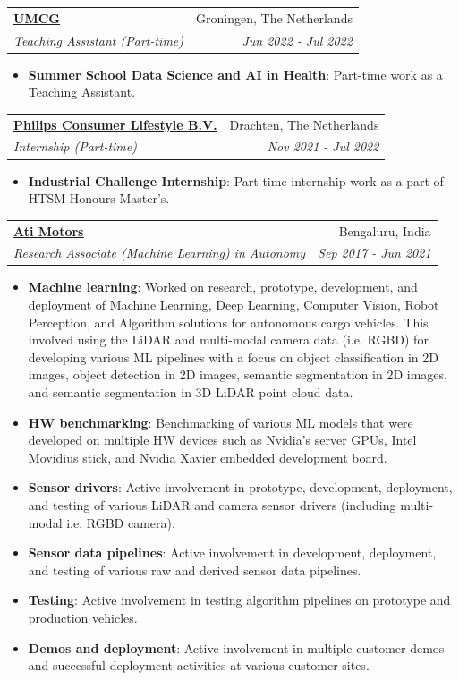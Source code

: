 \documentclass[letterpaper,12pt]{article}
\makeatletter
\newcommand{\resumeItem}[2]{
    \item\small{
        \textbf{#1}{: #2 \vspace{-2pt}}
    }
}
\newcommand{\resumeSubheading}[4]{
    \vspace{-1pt}\item
    \begin{tabular*}{0.97\textwidth}{l@{\extracolsep{\fill}}r}
        \textbf{#1} & #2 \\
        \textit{\small#3} & \textit{\small #4} \\
    \end{tabular*}\vspace{-5pt}
}
\newcommand{\resumeSubHeadingListStart}{\begin{itemize}[leftmargin=*]}
\newcommand{\resumeSubHeadingListEnd}{\end{itemize}}
\makeatother
\begin{document}
        \resumeSubheading{\underline{\href{https://www.umcg.nl/}{UMCG}}}{Groningen, The Netherlands}{Teaching Assistant (Part-time)}{Jun 2022 - Jul 2022}
            \resumeSubHeadingListStart
                \resumeItem{\href{https://www.rug.nl/research/gradschool-medical-sciences/summer-schools/data-science-and-ai/}{Summer School Data Science and AI in Health}}{Part-time work as a Teaching Assistant.}
            \resumeSubHeadingListEnd

        \resumeSubheading{\underline{{Philips Consumer Lifestyle B.V.}}}{Drachten, The Netherlands}{Internship (Part-time)}{Nov 2021 - Jul 2022}
            \resumeSubHeadingListStart
                \resumeItem{{Industrial Challenge Internship}}{Part-time internship work as a part of HTSM Honours Master's.}
            \resumeSubHeadingListEnd

        \resumeSubheading{\underline{\href{https://www.atimotors.com/}{Ati Motors}}}{Bengaluru, India}{Research Associate (Machine Learning) in Autonomy}{Sep 2017 - Jun 2021}
            \resumeSubHeadingListStart
                \resumeItem{Machine learning}
                {Worked on research, prototype, development, and deployment of Machine Learning, Deep Learning, Computer Vision, Robot Perception, and Algorithm solutions for autonomous cargo vehicles. This involved using the LiDAR and multi-modal camera data (i.e. RGBD) for developing various ML pipelines with a focus on object classification in 2D images, object detection in 2D images, semantic segmentation in 2D images, and semantic segmentation in 3D LiDAR point cloud data.}
                \resumeItem{HW benchmarking}{Benchmarking of various ML models that were developed on multiple HW devices such as Nvidia's server GPUs, Intel Movidius stick, and Nvidia Xavier embedded development board.}
                \resumeItem{Sensor drivers}{Active involvement in prototype, development, deployment, and testing of various LiDAR and camera sensor drivers (including multi-modal i.e. RGBD camera).}
                \resumeItem{Sensor data pipelines}{Active involvement in development, deployment, and testing of various raw and derived sensor data pipelines.}
                \resumeItem{Testing}{Active involvement in testing algorithm pipelines on prototype and production vehicles.}
                \resumeItem{Demos and deployment}{Active involvement in multiple customer demos and successful deployment activities at various customer sites.}
            \resumeSubHeadingListEnd
\end{document}
